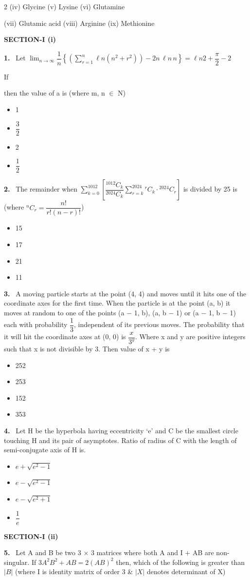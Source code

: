 \documentclass[10pt]{extarticle}
\newcommand{\partsec}[2]{\par\medskip\noindent{\large\bfseries PART-#1: #2}\par\smallskip}
\newcommand{\sect}[1]{\par\smallskip\noindent\textbf{#1}\par}
\newcommand{\qn}[1]{\par\smallskip\noindent\textbf{#1.}~}
\newenvironment{qoptions}{\begin{itemize}[leftmargin=1.8em,itemsep=1pt,topsep=2pt,label={}]}{\end{itemize}}
\newcommand{\opt}[2]{\item[(#1)] #2}
\begin{document}
\begin{multicols}{2}
(iv) Glycine \hfill (v) Lysine \hfill (vi) Glutamine\par
(vii) Glutamic acid \hfill (viii) Arginine \hfill (ix) Methionine
\raggedcolumns
\partsec{3}{MATHEMATICS}
\sect{SECTION-I (i)}
\qn{1} Let $\displaystyle\lim_{n\to\infty}\dfrac1n\left\{\left(\sum_{r=1}^n\ell n\left(n^2+r^2\right)\right)-2n\,\ell n\,n\right\}=\ell n2+\dfrac\pi2-2$\par
If\par{}\par then the value of a is (where m, n $\in$ N)
\begin{qoptions}
\opt{A}{1}
\opt{B}{$\dfrac32$}
\opt{C}{2}
\opt{D}{$\dfrac12$}
\end{qoptions}
\qn{2} The remainder when $\displaystyle\sum_{k=0}^{1012}\left[\dfrac{{}^{1012}C_k}{{}^{2024}C_k}\sum_{r=k}^{2024}{}^rC_k\cdot{}^{2024}C_r\right]$ is divided by 25 is (where ${}^nC_r=\dfrac{n!}{r!(n-r)!}$)
\begin{qoptions}
\opt{A}{15}
\opt{B}{17}
\opt{C}{21}
\opt{D}{11}
\end{qoptions}
\qn{3} A moving particle starts at the point (4, 4) and moves until it hits one of the coordinate axes for the first time. When the particle is at the point (a, b) it moves at random to one of the points (a $-$ 1, b), (a, b $-$ 1) or (a $-$ 1, b $-$ 1) each with probability $\dfrac13$, independent of its previous moves. The probability that it will hit the coordinate axes at (0, 0) is $\dfrac{x}{3^y}$. Where x and y are positive integers such that x is not divisible by 3. Then value of x + y is
\begin{qoptions}
\opt{A}{252}
\opt{B}{253}
\opt{C}{152}
\opt{D}{353}
\end{qoptions}
\qn{4} Let H be the hyperbola having eccentricity `e' and C be the smallest circle touching H and its pair of asymptotes. Ratio of radius of C with the length of semi-conjugate axis of H is.
\begin{qoptions}
\opt{A}{$e+\sqrt{e^2-1}$}
\opt{B}{$e-\sqrt{e^2-1}$}
\opt{C}{$e-\sqrt{e^2+1}$}
\opt{D}{$\dfrac1e$}
\end{qoptions}
\sect{SECTION-I (ii)}
\qn{5} Let A and B be two 3 $\times$ 3 matrices where both A and I + AB are non-singular. If $3A^2B^2+AB=2(AB)^2$ then, which of the following is greater than $|B|$ (where I is identity matrix of order 3 \& $|X|$ denotes determinant of X)

\end{multicols}
\end{document}
